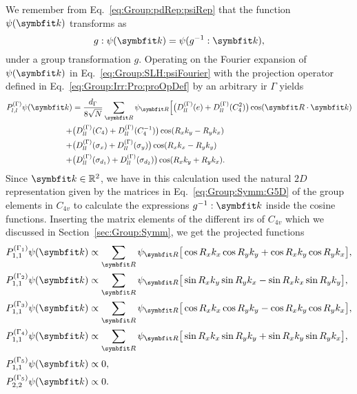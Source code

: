 We remember from Eq.~\eqref{eq:Group:pdRep:psiRep} that the function $\psi(\v{k})$ transforms as 
\begin{equation}
g:\psi(\v{k}) = \psi(g^{-1}:\v{k}),
\end{equation}
under a group
transformation $g$. Operating on the Fourier expansion of $\psi(\v{k})$ in Eq.~\eqref{eq:Group:SLH:psiFourier} with the projection operator
defined in Eq.~\eqref{eq:Group:Irr:Pro:proOpDef} by an arbitrary \ac{ir} $\Gamma$ yields
\begin{equation}
    \label{eq:Group:SLH:even:Ppsi}
    \begin{split}
        P_{l,l}^{(\Gamma)}\psi(\v{k}) &= \frac{d_\Gamma}{8\sqrt{N}}\sum_\v{R}\psi_\v{R}\Big[\big(D_{ll}^{(\Gamma)}(e)+D_{ll}^{(\Gamma)}(C_4^2)\big)\cos(\v{R}\cdot\v{k})\\
        + & \big(D_{ll}^{(\Gamma)}(C_4) + D_{ll}^{(\Gamma)}(C_4^{-1})\big)\cos(R_xk_y-R_yk_x)\\
        + & \big(D_{ll}^{(\Gamma)}(\sigma_x) + D_{ll}^{(\Gamma)}(\sigma_y)\big)\cos(R_xk_x-R_yk_y)\\
        + & \big(D_{ll}^{(\Gamma)}(\sigma_{d_1}) + D_{ll}^{(\Gamma)}(\sigma_{d_2})\big)\cos(R_xk_y+R_yk_x).
    \end{split}
\end{equation}
Since $\v{k}\in\mathbb{R}^2$, we have in this calculation used the natural $2D$ representation given by the matrices in Eq.~\eqref{eq:Group:Symm:G5D}
of the group elements in $C_{4v}$ to calculate the expressions $g^{-1}:\v{k}$ inside the cosine functions. Inserting the matrix elements of the different
\ac{ir}s of $C_{4v}$ which we discussed in Section~\ref{sec:Group:Symm}, we get the projected functions 
%
\begin{equation}
    \label{eq:Group:SLH:even:projections}
    \begin{split}
        P_{1,1}^{(\Gamma_1)}\psi(\v{k}) &\propto \sum_\v{R}\psi_\v{R}\big[\cos R_xk_x\cos R_yk_y + \cos R_xk_y\cos R_yk_x\big],\\
        P_{1,1}^{(\Gamma_2)}\psi(\v{k}) &\propto \sum_\v{R}\psi_\v{R}\big[\sin R_xk_y\sin R_yk_x - \sin R_xk_x\sin R_yk_y\big],\\
        P_{1,1}^{(\Gamma_3)}\psi(\v{k}) &\propto \sum_\v{R}\psi_\v{R}\big[\cos R_xk_x\cos R_yk_y - \cos R_xk_y\cos R_yk_x\big],\\
        P_{1,1}^{(\Gamma_4)}\psi(\v{k}) &\propto \sum_\v{R}\psi_\v{R}\big[\sin R_xk_x\sin R_yk_y + \sin R_xk_y\sin R_yk_x\big],\\
        P_{1,1}^{(\Gamma_5)}\psi(\v{k}) &\propto 0,\\
        P_{2,2}^{(\Gamma_5)}\psi(\v{k}) &\propto 0.
    \end{split}
\end{equation}
